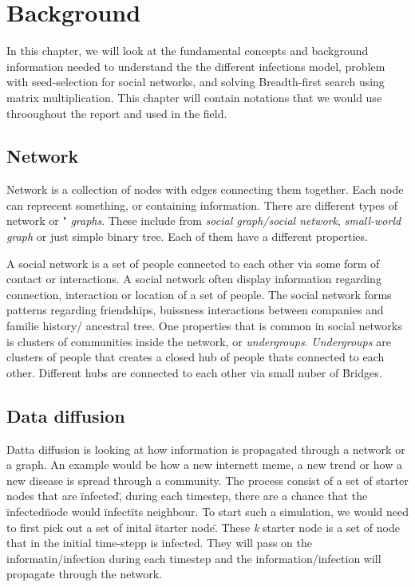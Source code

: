 \chapter{Background} 

In this chapter, we will look at the fundamental concepts and background information needed to understand the the different infections model, problem with seed-selection for social networks, and solving Breadth-first search using matrix multiplication. This chapter will contain notations that we would use throoughout the report and used in the field. 

\section{Network}
Network is a collection of nodes with edges connecting them together\cite{TheStrucandcomplex}. Each node can reprecent something, or containing information. There are different types of network or " {\it graphs}. These include from {\it social graph/social network}, {\it small-world graph} or just simple binary tree. Each of them have a different properties.

A social network is a set of people connected to each other via some form of contact or interactions. A social network often display information regarding connection, interaction or location of a set of people. The social network forms patterns regarding friendships, buissness interactions between companies and familie history/ ancestral tree. One properties that is common in social networks is clusters of communities inside the network, or {\it undergroups}. {\it Undergroups} are clusters of people that creates a closed hub of people thats connected to each other. Different hubs are connected to each other via small nuber of \" Bridges\" \cite{MaxSpread}.  


\section{Data diffusion}
Datta diffusion is looking at how information is propagated through a network or a graph. An example would be how a new internett meme, a new trend or how a new disease is spread through a community. The process consist of a set of starter nodes that are \"infected\", during each timestep, there are a chance that the \"infected\" node would \"infect\" its neighbour. To start such a simulation, we would need to first pick out a set of inital \"starter node\". These {\it k} starter node is a set of node that in the initial time-stepp is infected. They will pass on the informatin/infection during each timestep and the information/infection will propagate through the network.

